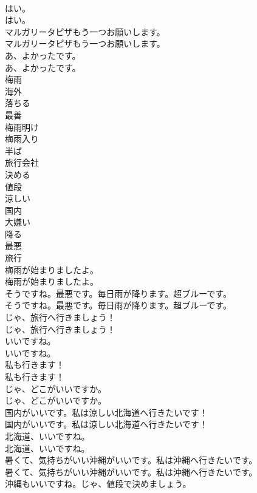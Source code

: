 \documentclass[8pt]{extreport}
\begin{document}
\begin{CJK}{UTF8}{min}
\\	はい。	
\\	はい。 
\\	マルガリータピザもう一つお願いします。	
\\	マルガリータピザもう一つお願いします。 
\\	あ、よかったです。	
\\	あ、よかったです。 
\\	梅雨
\\	海外
\\	落ちる
\\	最善
\\	梅雨明け
\\	梅雨入り
\\	半ば
\\	旅行会社
\\	決める
\\	値段
\\	涼しい
\\	国内
\\	大嫌い
\\	降る
\\	最悪
\\	旅行
\\	梅雨が始まりましたよ。	
\\	梅雨が始まりましたよ。 
\\	そうですね。最悪です。毎日雨が降ります。超ブルーです。	
\\	そうですね。最悪です。毎日雨が降ります。超ブルーです。 
\\	じゃ、旅行へ行きましょう！	
\\	じゃ、旅行へ行きましょう！ 
\\	いいですね。	
\\	いいですね。 
\\	私も行きます！	
\\	私も行きます！ 
\\	じゃ、どこがいいですか。	
\\	じゃ、どこがいいですか。 
\\	国内がいいです。私は涼しい北海道へ行きたいです！	
\\	国内がいいです。私は涼しい北海道へ行きたいです！ 
\\	北海道、いいですね。	
\\	北海道、いいですね。 
\\	暑くて、気持ちがいい沖縄がいいです。私は沖縄へ行きたいです。	
\\	暑くて、気持ちがいい沖縄がいいです。私は沖縄へ行きたいです。 
\\	沖縄もいいですね。じゃ、値段で決めましょう。	

\end{CJK}
\end{document}
